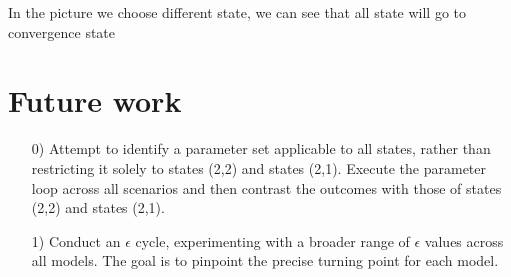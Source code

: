 \documentclass[11pt]{article}
\begin{document}
In the picture we choose different state, we can see that all state will go to convergence
state


\section{Future work}
\begin{itemize}
  \item [0)]
  	Attempt to identify a parameter set applicable to all states, rather than 
	restricting it solely to states (2,2) and states (2,1). Execute the parameter 
	loop across all scenarios and then contrast the outcomes with those of 
	states (2,2) and states (2,1).
  \item [1)]
  	Conduct an $\epsilon$ cycle, experimenting with a broader range of $\epsilon$
	values across all models. The goal is to pinpoint the precise turning point for 
	each model.
\end{itemize}
\end{document}
